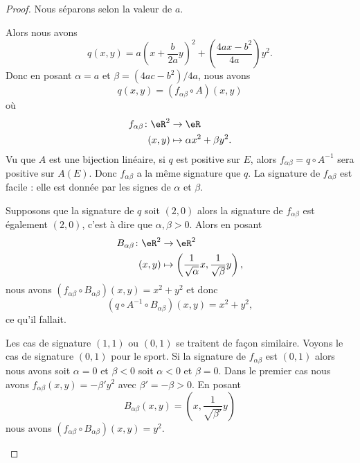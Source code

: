 \begin{proof}
	Nous séparons selon la valeur de \( a\).
	\begin{subproof}
		\spitem[Si \( a\neq 0\)]
		Alors nous avons
		\begin{equation}
			q(x,y)=a\left( x+\frac{ b }{ 2a }y \right)^2+\left( \frac{ 4ax-b^2 }{ 4a } \right)y^2.
		\end{equation}
		Donc en posant \( \alpha=a\) et \( \beta=(4ac-b^2)/4a\), nous avons
		\begin{equation}
			q(x,y)=(f_{\alpha\beta}\circ A)(x,y)
		\end{equation}
		où
		\begin{equation}
			\begin{aligned}
				f_{\alpha\beta}\colon \eR^2 & \to \eR                       \\
				(x,y)                       & \mapsto \alpha x^2+\beta y^2.
			\end{aligned}
		\end{equation}
		Vu que \( A\) est une bijection linéaire, si \( q\) est positive sur \( E\), alors \(f_{\alpha\beta}=q\circ A^{-1} \) sera positive sur \( A(E)\). Donc \( f_{\alpha\beta}\) a la même signature que \( q\). La signature de \( f_{\alpha\beta}\) est facile : elle est donnée par les signes de \( \alpha\) et \( \beta\).

		Supposons que la signature de \( q\) soit \( (2,0)\) alors la signature de \( f_{\alpha\beta}\) est également \( (2,0)\), c'est à dire que \( \alpha,\beta>0\). Alors en posant
		\begin{equation}
			\begin{aligned}
				B_{\alpha\beta}\colon \eR^2 & \to \eR^2                                                                    \\
				(x,y)                       & \mapsto \left( \frac{1}{ \sqrt{\alpha}}x,\frac{1}{ \sqrt{ \beta }}y \right),
			\end{aligned}
		\end{equation}
		nous avons \( (f_{\alpha\beta}\circ B_{\alpha\beta})(x,y)=x^2+y^2\) et donc
		\begin{equation}
			(q\circ A^{-1}\circ B_{\alpha\beta})(x,y)=x^2+y^2,
		\end{equation}
		ce qu'il fallait.

		Les cas de signature \( (1,1)\) ou \( (0,1)\) se traitent de façon similaire. Voyons le cas de signature \( (0,1)\) pour le sport. Si la signature de \( f_{\alpha\beta}\) est \( (0,1)\) alors nous avons soit \( \alpha=0\) et \( \beta<0\) soit \( \alpha<0\) et \( \beta=0\). Dans le premier cas nous avons \( f_{\alpha\beta}(x,y)=-\beta'y^2\) avec \( \beta'=-\beta>0\). En posant
		\begin{equation}
			B_{\alpha\beta}(x,y)=\left( x,\frac{1}{ \sqrt{ \beta' }}y \right)
		\end{equation}
		nous avons \( (f_{\alpha\beta}\circ B_{\alpha\beta})(x,y)=y^2\).


\end{subproof}
\end{proof}
